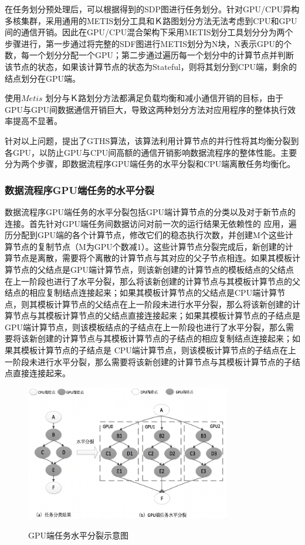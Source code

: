 在任务划分预处理后，可以根据得到的SDP图进行任务划分。针对GPU/CPU异构多核集群，采用通用的METIS划分工具和Ｋ路图划分方法无法考虑到CPU和GPU间的通信开销。因此在GPU/CPU混合架构下采用METIS划分工具划分分为两个步骤进行，第一步通过将完整的SDF图进行METIS划分为N块，N表示GPU的个数，每一个划分分配一个GPU；第二步通过遍历每一个划分中的计算节点并判断该节点的状态，如果该计算节点的状态为Stateful，则将其划分到CPU端，剩余的结点划分在GPU端。

使用$Metis$ 划分与Ｋ路划分方法都满足负载均衡和减小通信开销的目标，由于GPU与GPU间数据通信开销巨大，导致这两种划分方法对应用程序的整体执行效率提高不显著。

针对以上问题，提出了GTHS算法，该算法利用计算节点的并行性将其均衡分裂到各GPU，以防止GPU与CPU间高额的通信开销影响数据流程序的整体性能。主要分为两个步骤，即数据流程序GPU端任务的水平分裂和CPU端离散任务均衡化。

\subsubsection{数据流程序GPU端任务的水平分裂}

数据流程序GPU端任务的水平分裂包括GPU端计算节点的分类以及对于新节点的连接。首先针对GPU端任务间数据访问对前一次的运行结果无依赖性的 应用，遍历分配到GPU端的各个计算节点，修改它们的稳态执行次数，并创建M个这些计算节点的复制节点（M为GPU个数减1）。这些计算节点分裂完成后，新创建的计算节点是离散，需要将个离散的计算节点与其对应的父子节点相连。如果其模板计算节点的父结点是GPU端计算节点，则该新创建的计算节点的模板结点的父结点在上一阶段也进行了水平分裂，那么将该新创建的计算节点与其模板计算节点的父结点的相应复制结点连接起来；如果其模板计算节点的父结点是CPU端计算节点，则其模板计算节点的父结点在上一阶段未进行水平分裂，那么将该新创建的计算节点与其模板计算节点的父结点直接连接起来；如果其模板计算节点的子结点是GPU端计算节点，则该模板结点的子结点在上一阶段也进行了水平分裂，那么需要将该新创建的计算节点与其模板计算节点的子结点的相应复制结点连接起来；如果其模板计算节点的子结点是 CPU端计算节点，则该模板计算节点的子结点在上一阶段未进行水平分裂，那么需要将该新创建的计算节点与其模板计算节点的子结点直接连接起来。

\begin{figure}[htbp]
  \centering
  \includegraphics[width=0.8\textwidth]{Img/Chap_Application/Yu/3-1.png}\\
  \caption{GPU端任务水平分裂示意图}\label{fig:3.1}
\end{figure}

